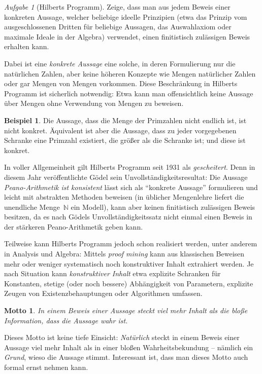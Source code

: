 \documentclass[a4paper,ngerman,12pt]{scrartcl}
\theoremstyle{definition}
\newtheorem{bsp}[defn]{Beispiel}
\theoremstyle{plain}
\newtheorem{motto}[defn]{Motto}
\theoremstyle{remark}
\newtheorem{aufg}[defn]{Aufgabe}
\newcommand{\NN}{\mathbb{N}}
\renewcommand{\_}{\mathpunct{.}\,}
\newcommand{\?}{\,{:}\,}
\begin{document}
\begin{aufg}[Hilberts Programm]Zeige, dass man aus jedem Beweis einer konkreten
Aussage, welcher beliebige ideelle Prinzipien (etwa das Prinzip vom ausgeschlossenen
Dritten für beliebige Aussagen, das Auswahlaxiom oder maximale Ideale in der Algebra)
verwendet, einen finitistisch zulässigen Beweis erhalten kann.\end{aufg}

Dabei ist eine \emph{konkrete Aussage} eine solche, in deren Formulierung nur
die natürlichen Zahlen, aber keine höheren Konzepte wie Mengen natürlicher
Zahlen oder gar Mengen von Mengen vorkommen. Diese Beschränkung in Hilberts
Programm ist sicherlich notwendig: Etwa kann man offensichtlich keine Aussage
über Mengen ohne Verwendung von Mengen zu beweisen.

\begin{bsp}Die Aussage, dass die Menge der Primzahlen nicht endlich ist, ist
nicht konkret. Äquivalent ist aber die Aussage, dass zu jeder vorgegebenen
Schranke eine Primzahl existiert, die größer als die Schranke ist; und diese
ist konkret.\end{bsp}

In voller Allgemeinheit gilt Hilberts Programm seit 1931 als
\emph{gescheitert}. Denn in diesem Jahr veröffentlichte Gödel sein
Unvollständigkeitsresultat: Die Aussage \emph{Peano-Arithmetik ist konsistent}
lässt sich als "`konkrete Aussage"' formulieren und leicht mit abstrakten
Methoden beweisen (in üblicher Mengenlehre liefert die unendliche Menge~$\NN$
ein Modell), kann aber keinen finitistisch zulässigen Beweis besitzen, da es
nach Gödels Unvollständigkeitssatz nicht einmal einen Beweis in der stärkeren
Peano-Arithmetik geben kann.

Teilweise kann Hilberts Programm jedoch schon realisiert werden, unter anderem
in Analysis und Algebra: Mittels \emph{proof mining} kann aus klassischen
Beweisen mehr oder weniger systematisch noch konstruktiver Inhalt extrahiert
werden. Je nach Situation kann \emph{konstruktiver Inhalt} etwa
explizite Schranken für Konstanten,
stetige (oder noch bessere) Abhängigkeit von Parametern,
explizite Zeugen von Existenzbehauptungen oder
Algorithmen
umfassen.

\begin{motto}\label{motto:inhaltvonbeweisen}In einem \emph{Beweis} einer
Aussage steckt viel mehr Inhalt als die bloße Information, dass die Aussage
wahr ist.\end{motto}

Dieses Motto ist keine tiefe Einsicht: \emph{Natürlich} steckt in
einem Beweis einer Aussage viel mehr Inhalt als in einer bloßen
Wahrheitsbekundung -- nämlich ein \emph{Grund}, wieso die Aussage stimmt.
Interessant ist, dass man dieses Motto auch formal ernst nehmen kann.
\end{document}
